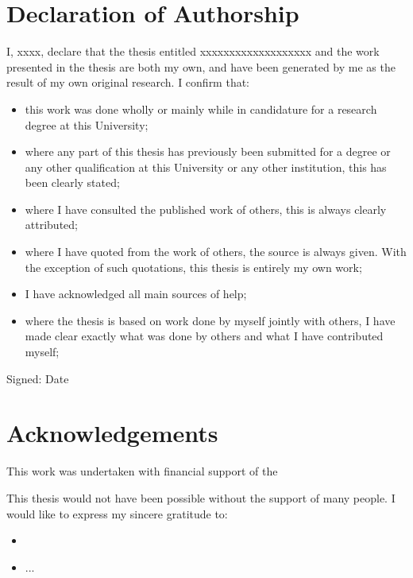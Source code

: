 \documentclass[11pt]{report}
\begin{document}
\chapter*{Declaration of Authorship}
I, xxxx, declare that the thesis entitled xxxxxxxxxxxxxxxxxxx and the work presented in the thesis are both my own, and have been generated by me as the result of my own original research. I confirm that:
\begin{itemize}
\item this work was done wholly or mainly while in candidature for a research degree at this University;
\item where any part of this thesis has previously been submitted for a degree or any other qualification at this University or any other institution, this has been clearly stated;
\item where I have consulted the published work of others, this is always clearly attributed;
\item where I have quoted from the work of others, the source is always given. With the exception of such quotations, this thesis is entirely my own work;
\item I have acknowledged all main sources of help;
\item where the thesis is based on work done by myself jointly with others, I have made clear exactly what was done by others and what I have contributed myself;
\end{itemize}
\vspace{2cm}
Signed: \dotfill
\vspace{2cm}
\newline
\noindent
Date

\chapter*{Acknowledgements}
This work was undertaken with financial support of the 

This thesis would not have been possible without the support of many people. I would like to express my sincere gratitude to:


\begin{itemize}
\item 
\item ...
\end{itemize}
\end{document}

